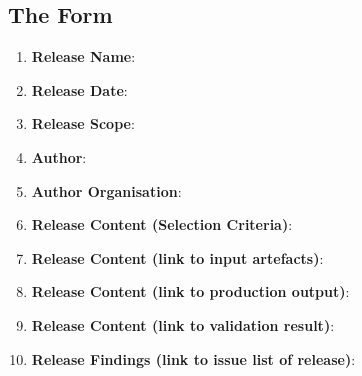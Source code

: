 \documentclass{template/openetcs_article}
\begin{document}
\subsection{The Form}
\begin{enumerate}
\item \textbf{Release Name}:
\item \textbf{Release Date}:
\item \textbf{Release Scope}:
\item \textbf{Author}:
\item \textbf{Author Organisation}:
\item \textbf{Release Content (Selection Criteria)}:
\item \textbf{Release Content (link to input artefacts)}:
\item \textbf{Release Content (link to production output)}:
\item \textbf{Release Content (link to validation result)}:
\item \textbf{Release Findings (link to issue list of release)}:
\end{enumerate}
\end{document}
